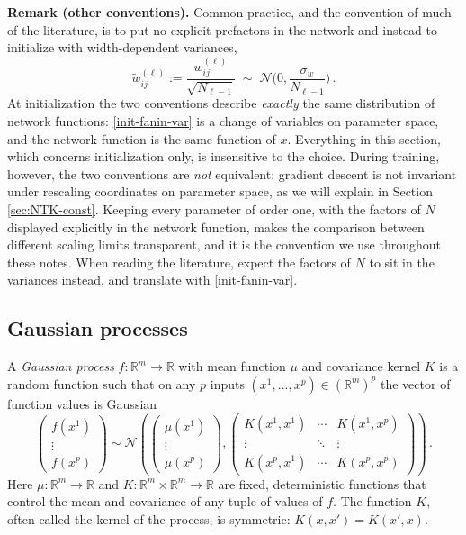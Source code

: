 \documentclass[11pt]{article}
\newcommand{\R}{\mathbb{R}}
\newcommand{\CN}{{\mathcal N}}
\begin{document}
\smallskip
\noindent\textbf{Remark (other conventions).} Common practice, and the convention of much of the literature, is to put no explicit prefactors in the network and instead to initialize with width-dependent variances,
%
\begin{equation} \label{init-fanin-var}
    \tilde w^{(\ell)}_{ij} := \frac{w^{(\ell)}_{ij}}{\sqrt{N_{\ell-1}}} \;\sim\; \CN\Big(0,\frac{\sigma_w}{N_{\ell-1}}\Big)\,.
\end{equation}
%
At initialization the two conventions describe \emph{exactly} the same distribution of network functions: \eqref{init-fanin-var} is a change of variables on parameter space, and the network function is the same function of $x$. Everything in this section, which concerns initialization only, is insensitive to the choice. During training, however, the two conventions are \emph{not} equivalent: gradient descent is not invariant under rescaling coordinates on parameter space, as we will explain in Section \ref{sec:NTK-const}. Keeping every parameter of order one, with the factors of $N$ displayed explicitly in the network function, makes the comparison between different scaling limits transparent, and it is the convention we use throughout these notes. When reading the literature, expect the factors of $N$ to sit in the variances instead, and translate with \eqref{init-fanin-var}.

\subsection{Gaussian processes}
\label{sec:GP}


A \emph{Gaussian process} $f:\R^m\to \R$ with mean function $\mu$ and covariance kernel $K$ is a random function such that on any $p$ inputs $(x^1,...,x^p)\in (\R^m)^p$ the vector of function values is Gaussian
%
\begin{equation} \begin{pmatrix} f(x^1) \\ \vdots \\ f(x^p) \end{pmatrix} \sim \CN \left( \begin{pmatrix} \mu(x^1) \\ \vdots \\ \mu(x^p) \end{pmatrix}, \begin{pmatrix} K(x^1,x^1) & \cdots & K(x^1,x^p) \\ \vdots & \ddots & \vdots \\ K(x^p,x^1) & \cdots & K(x^p,x^p) \end{pmatrix} \right)\,.  \end{equation}
%
Here $\mu:\R^m\to \R$ and $K:\R^m\times \R^m\to \R$ are fixed, deterministic functions that control the mean and covariance of any tuple of values of $f$. The function $K$, often called the kernel of the process, is symmetric: $K(x,x')=K(x',x)$.
\end{document}
